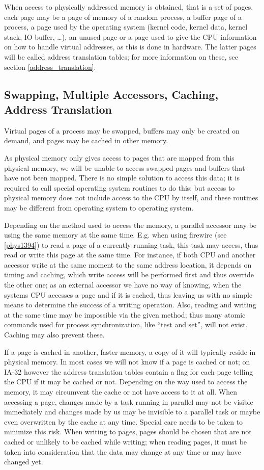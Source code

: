 When access to physically addressed memory is obtained, that is a set of pages,
each page may be a page of memory of a random process, a buffer page of a
process, a page used by the operating system (kernel code, kernel data, kernel
stack, IO buffer, \dots), an unused page or a page used to give the CPU
information on how to handle virtual addresses, as this is done in hardware.
The latter pages will be called address translation tables; for more information
on these, see section \ref{address_translation}.

\subsection{Swapping, Multiple Accessors, Caching, Address Translation}

Virtual pages of a process may be swapped, buffers may only be created on
demand, and pages may be cached in other memory.

As physical memory only gives access to pages that are mapped from this
physical memory, we will be unable to access swapped pages and buffers that
have not been mapped. There is no simple solution to access this data; it is
required to call special operating system routines to do this; but access to
physical memory does not include access to the CPU by itself, and these routines
may be different from operating system to operating system.

Depending on the method used to access the memory, a parallel accessor may be
using the same memory at the same time. E.g. when using firewire (see
\ref{phys1394}) to read a page of a currently running task, this task may
access, thus read or write this page at the same time. For instance, if both CPU
and another accessor write at the same moment to the same address location, it
depends on timing and caching, which write access will be performed first and
thus override the other one; as an external accessor we have no way of knowing,
when the systems CPU accesses a page and if it is cached, thus leaving us with
no simple means to determine the success of a writing operation.  Also, reading
and writing at the same time may be impossible via the given method; thus many
atomic commands used for process synchronization, like ``test and set'', will
not exist.  Caching may also prevent these.

If a page is cached in another, faster memory, a copy of it will typically
reside in physical memory. In most cases we will not know if a page is cached or
not; on IA-32 however the address translation tables contain a flag for each
page telling the CPU if it may be cached or not. Depending on the way used to
access the memory, it may circumvent the cache or not have access to it at all.
When accessing a page, changes made by a task running in parallel may not be
visible immediately and changes made by us may be invisible to a parallel task
or maybe even overwritten by the cache at any time. Special care needs to be
taken to minimize this risk. When writing to pages, pages should be chosen that
are not cached or unlikely to be cached while writing; when reading pages, it
must be taken into consideration that the data may change at any time or may
have changed yet.

